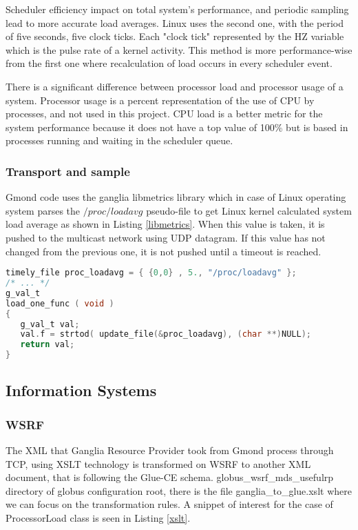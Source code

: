 Scheduler efficiency impact on total system's performance, and periodic sampling lead to more accurate load averages. Linux uses the second one, with the period of five seconds, five clock ticks. Each "clock tick" represented by the HZ variable which is the pulse rate of a kernel activity. This method is more performance-wise from the first one where recalculation of load occurs in every scheduler event. 

There is a significant difference between processor load and processor usage of a system. Processor usage is a percent representation of the use of CPU by processes, and not used in this project. CPU load is a better metric for the system performance because it does not have a top value of 100\% but is based in processes running and waiting in the scheduler queue.

\subsubsection{Transport and sample}
Gmond code uses the ganglia libmetrics library which in case of Linux operating system parses the $/proc/loadavg$ pseudo-file to get Linux kernel calculated system load average as shown in Listing \ref{libmetrics}. When this value is taken, it is pushed to the multicast network using UDP datagram. If this value has not changed from the previous one, it is not pushed until a timeout is reached.

\begin{lstlisting}[language=C,caption=libmetrics code to get load average,label=libmetrics]
timely_file proc_loadavg = { {0,0} , 5., "/proc/loadavg" };
/* ... */
g_val_t
load_one_func ( void )
{
   g_val_t val;
   val.f = strtod( update_file(&proc_loadavg), (char **)NULL);
   return val;
}
\end{lstlisting}

\subsection{Information Systems}

\subsubsection{WSRF}

The XML that Ganglia Resource Provider took from Gmond process through TCP, using XSLT technology is transformed on WSRF to another XML document, that is following the Glue-CE schema. globus\_wsrf\_mds\_usefulrp directory of globus configuration root, there is the file ganglia\_to\_glue.xslt where we can focus on the transformation rules. A snippet of interest for the case of ProcessorLoad class is seen in Listing \ref{xslt}.

